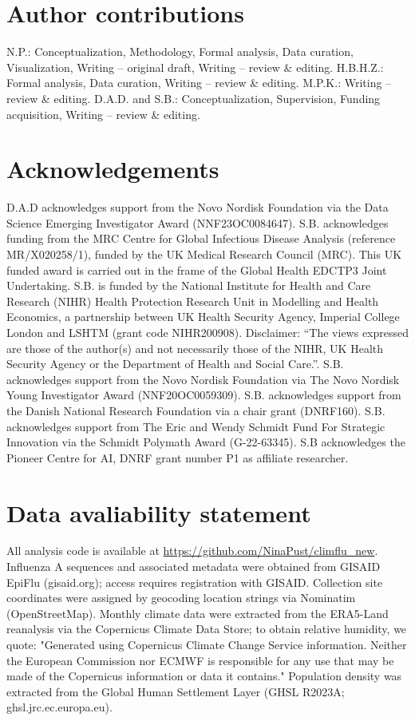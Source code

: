 \documentclass[11pt, a4paper]{article}
\begin{document}
\section*{Author contributions}

N.P.: Conceptualization, Methodology, Formal analysis, Data curation, Visualization, Writing – original draft, Writing – review \& editing. H.B.H.Z.: Formal analysis, Data curation, Writing – review \& editing. M.P.K.: Writing – review \& editing. D.A.D. and S.B.: Conceptualization, Supervision, Funding acquisition, Writing – review \& editing.

\section*{Acknowledgements}

D.A.D acknowledges support from the Novo Nordisk Foundation via the Data Science Emerging Investigator Award (NNF23OC0084647). S.B. acknowledges funding from the MRC Centre for Global Infectious Disease Analysis (reference MR/X020258/1), funded by the UK Medical Research Council (MRC). This UK funded award is carried out in the frame of the Global Health EDCTP3 Joint Undertaking. S.B. is funded by the National Institute for Health and Care Research (NIHR) Health Protection Research Unit in Modelling and Health Economics, a partnership between UK Health Security Agency, Imperial College London and LSHTM (grant code NIHR200908). Disclaimer: “The views expressed are those of the author(s) and not necessarily those of the NIHR, UK Health Security Agency or the Department of Health and Social Care.”. S.B. acknowledges support from the Novo Nordisk Foundation via The Novo Nordisk Young Investigator Award (NNF20OC0059309). S.B. acknowledges support from the Danish National Research Foundation via a chair grant (DNRF160). S.B. acknowledges support from The Eric and Wendy Schmidt Fund For Strategic Innovation via the Schmidt Polymath Award (G-22-63345). S.B acknowledges the Pioneer Centre for AI, DNRF grant number P1 as affiliate researcher. 

\section*{Data avaliability statement}

All analysis code is available at \href{https://github.com/NinaPust/climflu_new}{https://github.com/NinaPust/climflu_new}. Influenza A sequences and associated metadata were obtained from GISAID EpiFlu (gisaid.org); access requires registration with GISAID. Collection site coordinates were assigned by geocoding location strings via Nominatim (OpenStreetMap). Monthly climate data were extracted from the ERA5-Land reanalysis via the Copernicus Climate Data Store; to obtain relative humidity, we quote: "Generated using Copernicus Climate Change Service information. Neither the European Commission nor ECMWF is responsible for any use that may be made of the Copernicus information or data it contains." Population density was extracted from the Global Human Settlement Layer (GHSL R2023A; ghsl.jrc.ec.europa.eu).
\end{document}
